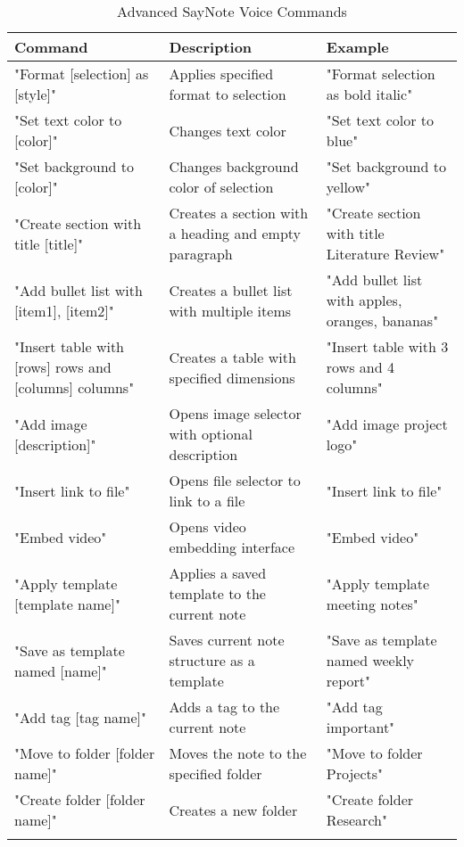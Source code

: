 \begin{longtable}{p{}p{}p{}}
\toprule
\textbf{Command} & \textbf{Description} & \textbf{Example} \\
\midrule
\endhead

"Format [selection] as [style]" & Applies specified format to selection & "Format selection as bold italic" \\
"Set text color to [color]" & Changes text color & "Set text color to blue" \\
"Set background to [color]" & Changes background color of selection & "Set background to yellow" \\
\midrule

"Create section with title [title]" & Creates a section with a heading and empty paragraph & "Create section with title Literature Review" \\
"Add bullet list with [item1], [item2]" & Creates a bullet list with multiple items & "Add bullet list with apples, oranges, bananas" \\
"Insert table with [rows] rows and [columns] columns" & Creates a table with specified dimensions & "Insert table with 3 rows and 4 columns" \\
\midrule

"Add image [description]" & Opens image selector with optional description & "Add image project logo" \\
"Insert link to file" & Opens file selector to link to a file & "Insert link to file" \\
"Embed video" & Opens video embedding interface & "Embed video" \\
\midrule

"Apply template [template name]" & Applies a saved template to the current note & "Apply template meeting notes" \\
"Save as template named [name]" & Saves current note structure as a template & "Save as template named weekly report" \\
\midrule

"Add tag [tag name]" & Adds a tag to the current note & "Add tag important" \\
"Move to folder [folder name]" & Moves the note to the specified folder & "Move to folder Projects" \\
"Create folder [folder name]" & Creates a new folder & "Create folder Research" \\

\bottomrule
\caption{Advanced SayNote Voice Commands}
\label{tab:advanced_commands}
\end{longtable}

